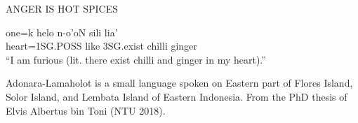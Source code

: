 \documentclass[a4paper,landscape,headrule,footrule,xetex]{foils}
\begin{document}

ANGER IS HOT SPICES
\begin{exe}
  \ex \gll one=k helo n-o'oN sili lia' \\
heart=1SG.POSS like 3SG.exist chilli ginger \\
\trans ``I am furious (lit. there exist chilli and ginger in my heart).''
\end{exe}

Adonara-Lamaholot is a small language spoken on Eastern part of Flores
Island, Solor Island, and Lembata Island of Eastern Indonesia.   From
the PhD thesis of Elvis Albertus bin Toni (NTU 2018).  
\end{document}

